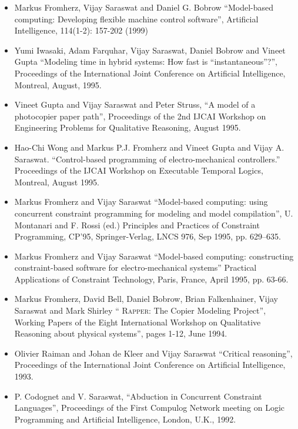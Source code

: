 \documentclass{article}
\begin{document}
\begin{itemize} 
\item  Markus Fromherz, Vijay Saraswat and Daniel G. Bobrow
  ``Model-based computing: Developing flexible machine control
  software'', Artificial Intelligence, 114(1-2): 157-202 (1999)

\item  Yumi Iwasaki, Adam Farquhar, Vijay Saraswat, Daniel Bobrow
  and Vineet Gupta ``Modeling time in hybrid systems: How fast is
  ``instantaneous''?'', Proceedings of the International Joint
  Conference on Artificial Intelligence, Montreal, August, 1995.
  
\item  Vineet Gupta and Vijay Saraswat and Peter Struss, ``A model
  of a photocopier paper path'', Proceedings of the 2nd IJCAI
  Workshop on Engineering Problems for Qualitative Reasoning,
  August 1995.

\item Hao-Chi Wong and Markus P.J. Fromherz and Vineet Gupta and Vijay
  A. Saraswat. ``Control-based programming of electro-mechanical
  controllers.'' Proceedings of the IJCAI Workshop on Executable
  Temporal Logics, Montreal, August 1995.

\item  Markus Fromherz and Vijay Saraswat   ``Model-based
  computing: using concurrent constraint programming for modeling
  and model compilation'', U. Montanari  and F. Rossi (ed.)
  Principles and Practices of Constraint Programming, CP'95,
  Springer-Verlag, LNCS 976, Sep 1995, pp. 629--635. 
  
\item  Markus Fromherz and Vijay Saraswat ``Model-based
  computing: constructing constraint-based software for
  electro-mechanical systems'' Practical Applications of
  Constraint Technology, Paris, France, April 1995, pp. 63-66.

\item  Markus Fromherz, David Bell, Daniel Bobrow, Brian
  Falkenhainer, Vijay Saraswat and Mark Shirley ``\textsc{ Rapper}:
  The Copier Modeling Project'', Working Papers of the Eight
  International Workshop on Qualitative Reasoning about physical
  systems'', pages 1-12, June 1994. 

\item Olivier Raiman and Johan de Kleer and Vijay Saraswat ``Critical
  reasoning'', Proceedings of the International Joint Conference on
  Artificial Intelligence, 1993.

\item P. Codognet and V. Saraswat, ``Abduction in Concurrent
  Constraint Languages'', Proceedings of the First Compulog Network
  meeting on Logic Programming and Artificial Intelligence, London,
  U.K., 1992.


\end{itemize}
\end{document}
